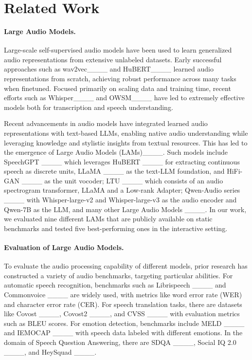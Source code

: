 \section{Related Work}
\paragraph{Large Audio Models.} Large-scale self-supervised audio models have been used to learn generalized audio representations from extensive unlabeled datasets. Early successful approaches such as wav2vec____ and  HuBERT____ learned audio representations from scratch, achieving robust performance across many tasks when finetuned. Focused primarily on scaling data and training time, recent efforts such as Whisper____ and OWSM____ have led to extremely effective models both for transcription and speech understanding.

Recent advancements in audio models have integrated learned audio representations with text-based LLMs, enabling native audio understanding while leveraging knowledge and stylistic insights from textual resources. This has led to the emergence of Large Audio Models (LAMs)____. Such models include SpeechGPT ____ which leverages HuBERT ____ for extracting continuous speech as discrete units, LLaMA ____ as the text-LLM foundation, and HiFi-GAN ____ as the unit vocoder; LTU ____ which consists of an audio spectrogram transformer, LLaMA and a Low-rank Adapter; Qwen-Audio series ____ with Whisper-large-v2 and Whisper-large-v3 as the audio encoder and Qwen-7B as the LLM, and many other Large Audio Models ____. In our work, we evaluated nine different LAMs that are publicly available on static benchmarks and tested five best-performing ones in the interactive setting.

\paragraph{Evaluation of Large Audio Models.}
To evaluate the audio processing capability of different models, prior research has constructed a variety of audio benchmarks, targeting particular abilities. For automatic speech recognition, benchmarks such as Librispeech ____ and Commonvoice ____ are widely used, with metrics like word error rate (WER) and character error rate (CER). For speech translation tasks, there are datasets like Covost ____, Covost2 ____, and CVSS ____ with evaluation metrics such as BLEU scores. For emotion detection, benchmarks include MELD ____ and IEMOCAP ____ with speech data labeled with different emotions. In the domain of Speech Question Answering, there are SDQA ____, Social IQ 2.0 ____, and HeySquad ____.

